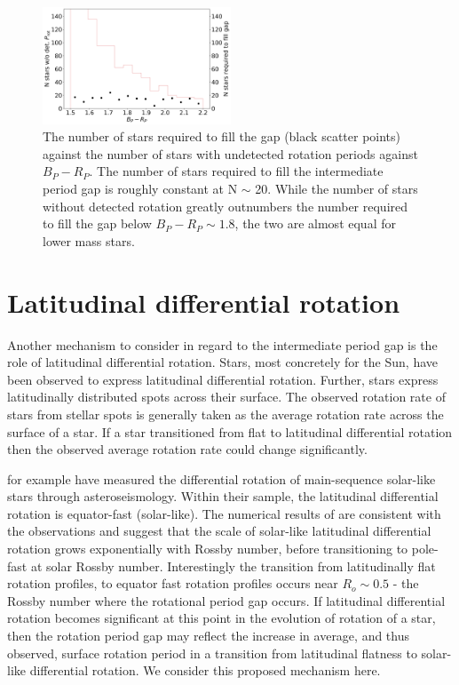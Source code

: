 \begin{figure}
\centering
    \includegraphics[width=0.5\textwidth]{Figures/rot_gap_figures/stars_donot_fullgap.png}
    \caption{
    	The number of stars required to fill the gap (black scatter points) against the number of stars with undetected rotation periods against $B_P-R_P$. The number of stars required to fill the intermediate period gap is roughly constant at N $\sim$ 20. While the number of stars without detected rotation greatly outnumbers the number required to fill the gap below $B_P-R_P \sim 1.8$, the two are almost equal for lower mass stars.
}
    \label{fig:stars_not_fill}
\end{figure}


\section{Latitudinal differential rotation}


Another mechanism to consider in regard to the intermediate period gap is the role of latitudinal differential rotation.
Stars, most concretely for the Sun, have been observed to express latitudinal differential rotation. 
Further, stars express latitudinally distributed spots across their surface.
The observed rotation rate of stars from stellar spots is generally taken as the average rotation rate across the surface of a star.
If a star transitioned from flat to latitudinal differential rotation then the observed average rotation rate could change significantly.

\citet{hall,benomar,bazot} for example have measured the differential rotation of main-sequence solar-like stars through asteroseismology.
Within their sample, the latitudinal differential rotation is equator-fast (solar-like).
The numerical results of \citet{brun 2022} are consistent with the observations and suggest that the scale of solar-like latitudinal differential rotation grows exponentially with Rossby number, before transitioning to pole-fast at solar Rossby number.
Interestingly the transition from latitudinally flat rotation profiles, to equator fast rotation profiles occurs near $R_o \sim 0.5$ - the Rossby number where the rotational period gap occurs.
If latitudinal differential rotation becomes significant at this point in the evolution of rotation of a star, then the rotation period gap may reflect the increase in average, and thus observed, surface rotation period in a transition from latitudinal flatness to solar-like differential rotation.
We consider this proposed mechanism here.


